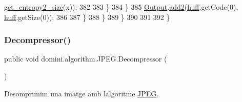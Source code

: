 \begin{DoxyCode}
      \hyperlink{classdomini_1_1algorithm_1_1JPEG_aa9bc9bee7181efee254be843e23ee2c6}{get\_entropy2\_size}(x));
382                             
383                         \}
384                     \}
385                     \hyperlink{classdomini_1_1algorithm_1_1Algorithm_a4de9955411c656325adc391ef570c082}{Output}.\hyperlink{classpersistencia_1_1output_1_1Ctrl__Output_ad4738467c2312b0e079c14003e548dd6}{add2}(\hyperlink{classdomini_1_1algorithm_1_1JPEG_aacc6445baa7819e3f9139ffb78e0b8f4}{huff}.getCode(0), \hyperlink{classdomini_1_1algorithm_1_1JPEG_aacc6445baa7819e3f9139ffb78e0b8f4}{huff}.getSize(0));
386 
387                 \}
388             \}
389         \}
390 
391         
392     \}
\end{DoxyCode}
\mbox{\label{classdomini_1_1algorithm_1_1JPEG_accca347e84e41b254d1f4a7bbdf2201a}} 
\subsubsection{\texorpdfstring{Decompressor()}{Decompressor()}}
{\footnotesize\ttfamily public void domini.\+algorithm.\+J\+P\+E\+G.\+Decompressor (\begin{DoxyParamCaption}{ }\end{DoxyParamCaption})\hspace{0.3cm}{\ttfamily [inline]}}



Desomprimim una imatge amb l\textquotesingle{}algoritme \hyperlink{classdomini_1_1algorithm_1_1JPEG}{J\+P\+EG}. 


